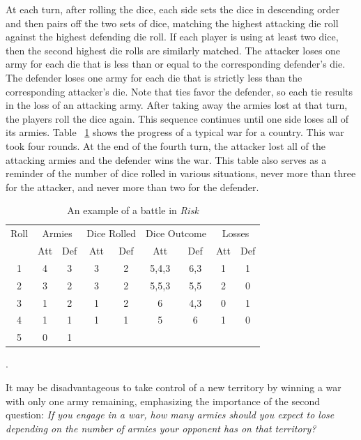 \documentclass[12pt]{article}
\begin{document}
At each turn, after rolling the dice, each side sets the dice in
descending order and then pairs off the two sets of dice, matching the
highest attacking die roll against the highest defending die roll.  If
each player is using at least two dice, then the second highest die
rolls are similarly matched.  The attacker loses one army for each die
that is less than or equal to the corresponding defender's die.  The
defender loses one army for each die that is strictly less than the
corresponding attacker's die.  Note that ties favor the defender, so
each tie results in the loss of an attacking army.  After taking away
the armies lost at that turn, the players roll the dice again.  This
sequence continues until one side loses all of its armies.  Table~%
\ref{tab:games:riskwar} shows the progress of a typical war for a
country.  This war took four rounds.  At the end of the fourth turn, the
attacker lost all of the attacking armies and the defender wins the war.
This table also serves as a reminder of the number of dice rolled in
various situations, never more than three for the attacker, and never
more than two for the defender.

\begin{table}
    \centering
    \begin{tabular}{ccccccccc}
        Roll & \multicolumn{2}{c}{Armies} & \multicolumn{2}{c}{Dice Rolled} & \multicolumn{2}{c}{Dice Outcome} & \multicolumn{2}{c}{Losses} \\ 
             & Att      & Def      & Att      & Def      & Att   & Def  & Att  & Def  \\ 
        1    & 4        & 3        & 3        & 2        & 5,4,3 & 6,3  & 1    & 1    \\ 
        2    & 3        & 2        & 3        & 2        & 5,5,3 & 5,5  & 2    & 0    \\ 
        3    & 1        & 2        & 1        & 2        & 6     & 4,3  & 0    & 1    \\ 
        4    & 1        & 1        & 1        & 1        & 5     & 6    & 1    & 0    \\ 
        5    & 0        & 1        &          &          &       &      &      &      \\ 
    \end{tabular}
    \caption{An example of a battle in \emph{Risk}}.%
    \label{tab:games:riskwar}
\end{table}

It may be disadvantageous to take control of a new territory by winning
a war with only one army remaining, emphasizing the importance of the
second question:  \emph{If you engage in a war, how many armies should
you expect to lose depending on the number of armies your opponent has
on that territory?}
\end{document}
